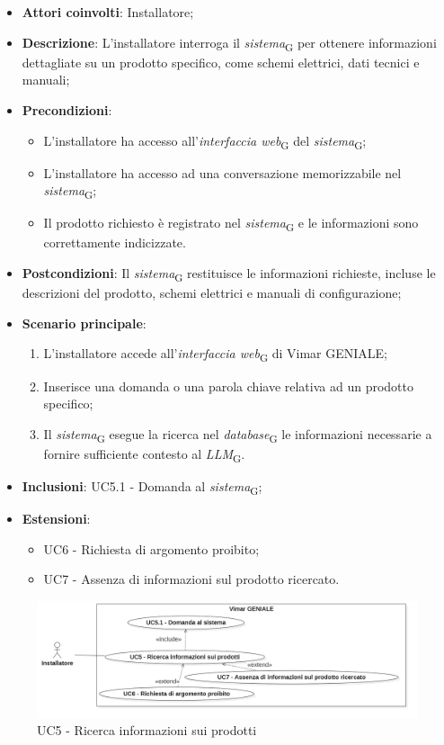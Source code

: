\begin{itemize}
    \item \textbf{Attori coinvolti}: Installatore;
    \item \textbf{Descrizione}: L’installatore interroga il \textit{sistema}\textsubscript{G} per ottenere informazioni dettagliate su un prodotto specifico, come schemi elettrici, dati tecnici e manuali;
    \item \textbf{Precondizioni}: 
    \begin{itemize}
        \item L’installatore ha accesso all’\textit{interfaccia web}\textsubscript{G} del \textit{sistema}\textsubscript{G};
        \item L’installatore ha accesso ad una conversazione memorizzabile nel \textit{sistema}\textsubscript{G};
        \item Il prodotto richiesto è registrato nel \textit{sistema}\textsubscript{G} e le informazioni sono correttamente indicizzate.
    \end{itemize}
    \item \textbf{Postcondizioni}: Il \textit{sistema}\textsubscript{G} restituisce le informazioni richieste, incluse le descrizioni del prodotto, schemi elettrici e manuali di configurazione;
    \item \textbf{Scenario principale}:
    \begin{enumerate}
        \item L’installatore accede all’\textit{interfaccia web}\textsubscript{G} di Vimar GENIALE;
        \item Inserisce una domanda o una parola chiave relativa ad un prodotto specifico;
        \item Il \textit{sistema}\textsubscript{G} esegue la ricerca nel \textit{database}\textsubscript{G} le informazioni necessarie a fornire sufficiente contesto al \textit{LLM}\textsubscript{G}.
    \end{enumerate}
    \item \textbf{Inclusioni}: UC5.1 - Domanda al \textit{sistema}\textsubscript{G};
    \item \textbf{Estensioni}: 
    \begin{itemize}
        \item UC6 - Richiesta di argomento proibito;
        \item UC7 - Assenza di informazioni sul prodotto ricercato.
    \end{itemize}
\end{itemize}
\begin{figure}[H]
\centering
\includegraphics[width=1\textwidth]{contents/casi_duso/png/UC5.png}
\caption{UC5 - Ricerca informazioni sui prodotti}
\end{figure}

